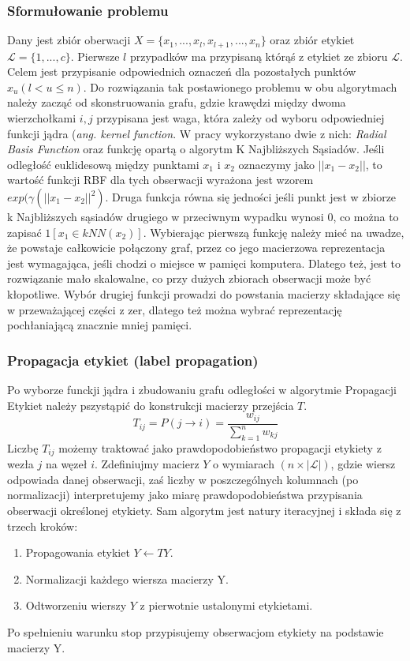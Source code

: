 \documentclass{article}
\begin{document}
\subsubsection{Sformułowanie problemu}
Dany jest zbiór oberwacji \(X = \{x_1, ..., x_l, x_{l+1}, ..., x_n\}\) oraz zbiór etykiet \(\mathcal{L} = \{1, ... ,c\}\).
Pierwsze \(l\) przypadków ma przypisaną którąś z etykiet ze zbioru \(\mathcal{L}\). Celem jest przypisanie odpowiednich oznaczeń dla pozostałych punktów \(x_u(l  < u \leqslant n)\).
Do rozwiązania tak postawionego problemu w obu algorytmach należy zacząć od skonstruowania grafu, gdzie krawędzi między dwoma wierzchołkami \(i, j\) przypisana jest waga, która zależy od wyboru odpowiedniej funkcji jądra (\emph{ang. kernel function}. W pracy wykorzystano dwie z nich: \emph{Radial Basis Function} oraz funkcję opartą o algorytm K Najbliższych Sąsiadów. Jeśli odległość euklidesową między punktami \(x_1\) i \(x_2\) oznaczymy jako \(||x_1 - x_2||\), to wartość funkcji RBF dla tych obserwacji wyrażona jest wzorem \(exp(\gamma(||x_1 - x_2||^2)\).
Druga funkcja równa się jedności jeśli punkt jest w zbiorze k Najbliższych sąsiadów drugiego w przeciwnym wypadku wynosi 0, co można to zapisać \(1[x_1 \in kNN(x_2)]\). 
Wybierając pierwszą funkcję należy mieć na uwadze, że powstaje całkowicie połączony graf, przez co jego macierzowa reprezentacja jest wymagająca, jeśli chodzi o miejsce w pamięci komputera.
Dlatego też, jest to rozwiązanie mało skalowalne, co przy dużych zbiorach obserwacji może być kłopotliwe.
Wybór drugiej funkcji prowadzi do powstania macierzy składające się w przeważającej części z zer, dlatego też można wybrać reprezentację pochłaniającą znacznie mniej pamięci.
\subsubsection{Propagacja etykiet (label propagation)}
Po wyborze funckji jądra i zbudowaniu grafu odległości w algorytmie Propagacji Etykiet należy pszystąpić do konstrukcji macierzy przejścia \(T\).
\[T_{ij} = P(j \rightarrow i) = \frac{w_{ij}}{\sum^n_{k=1}w_{kj}}\]
Liczbę \(T_{ij}\) możemy traktować jako prawdopodobieństwo propagacji etykiety z wezła \(j\) na węzeł \(i\). Zdefiniujmy macierz \(Y\) o wymiarach \((n \times |\mathcal{L}|)\), gdzie wiersz odpowiada danej obserwacji, zaś liczby w poszczególnych kolumnach (po normalizacji) interpretujemy jako miarę prawdopodobieństwa przypisania obserwacji określonej etykiety.
Sam algorytm jest natury iteracyjnej i składa się z trzech kroków:
\begin{enumerate}
	\item Propagowania etykiet \(Y \leftarrow TY\).
	\item Normalizacji każdego wiersza macierzy Y.
	\item Odtworzeniu wierszy \(Y\) z pierwotnie ustalonymi etykietami.
\end{enumerate}
Po spełnieniu warunku stop przypisujemy obserwacjom etykiety na podstawie macierzy Y\cite{Zhu2002}.
\end{document}
